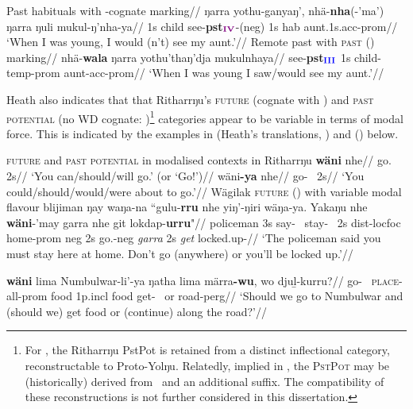 \pex\a\begingl\glpreamble Past habituals with \IV-cognate marking//
 \gla ŋarra yothu-ganyaŋ', nhä-\textbf{nha}(-'ma') ŋarra ŋuli mukul-ŋ'nha-ya//
\glb 1s child see-\textbf{\gls{pst}}$_{\textbf{\textcolor{violet}{IV}}}$-(\gls{neg}) 1s \gls{hab} aunt.1s.\gls{acc}-\gls{prom}//
\glft`When I was young, I would (n't) see my aunt.'\trailingcitation{[RN~20190522]}//\endgl
\a\begingl\glpreamble Remote past with \textsc{past} (\III) marking//
\gla nhä-\textbf{wala} ŋarra yothu'thaŋ'dja mukulnhaya//
\glb see-\textbf{\gls{pst}}$_{\textbf{\textcolor{blue}{III}}}$ 1s child-\gls{temp}-\gls{prom} aunt-\gls{acc}-\gls{prom}//
\glft `When I was young I saw/would see my aunt.'\trailingcitation{[AL~20190522]}//\endgl
\xe




Heath also indicates that that Ritharrŋu's \textsc{future} (cognate with \II) and \textsc{past potential} (no WD cognate: \V)\footnote{For \citet{Bowern2009}, the Ritharrŋu \gls{PstPot} is retained from a distinct inflectional category, reconstructable to Proto-Yolŋu. Relatedly, implied in \citet[20,23,104]{Heath1980r}, the \textsc{PstPot} may be (historically) derived from \II~and an additional suffix. The compatibility of these reconstructions is not further considered in this dissertation.} categories appear to be variable in terms of modal force. This is indicated by the examples in (Heath's translations, \nextx) and () below.

\pex \textsc{future} and \textsc{past potential} in modalised contexts in Ritharrŋu
\a\begingl\gla \textbf{wäni} nhe//
\glb go.\II~ 2s//
\glft `You can/should/will go.' (or `Go!')//\endgl
\a\begingl\gla wäni\textbf{-ya} nhe//
\glb go-\V~ 2s//
\glft`You could/should/would/were about to go.'//\endgl
\xe
\pex Wägilak \textsc{future} (\II) with variable modal flavour
\a \begingl\gla blijiman ŋay waŋa-na ``gulu-\textbf{rru} nhe yiŋ'-ŋiri wäŋa-ya. Yakaŋu nhe \textbf{wäni}-'may garra nhe git lokdap-\textbf{urru}"//
\glb policeman 3s say-\III~ stay-\II~ 2s \gls{dist}-\gls{loc}\textdblhyphen\gls{foc} home-\gls{prom} \gls{neg} 2s go.\II-\gls{neg} \textit{garra} 2s \textit{get} locked.up-\II//
\glft`The policeman said you must stay here at home. Don't go (anywhere) or you'll be locked up.'\trailingcitation{[RŊ~20190520~18']}//
\endgl

\a\begingl\gla \textbf{wäni} lima Numbulwar-li'-ya ŋatha lima märra\textbf{-wu}, wo djuḻ-kurru?//
\glb go-\II~ \textsc{place}-\gls{all}-\gls{prom} food 1p.\gls{incl} food get-\II~ or road-\gls{perg}//
\glft`Should we go to Numbulwar and (should we) get food or (continue) along the road?'\trailingcitation{[PW~20190520~25']}//\endgl


